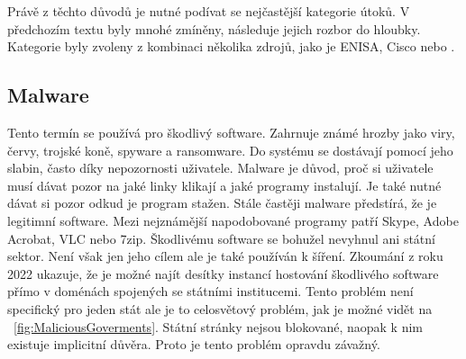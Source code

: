 Právě z těchto důvodů je nutné podívat se nejčastější kategorie útoků.
V předchozím textu byly mnohé zmíněny, následuje jejich rozbor do hloubky.
Kategorie byly zvoleny z kombinaci několika zdrojů, jako je \ac{ENISA}\cite{Enisa_thread_landscape}, Cisco\cite{cisco_most_common_attack} nebo \cite{nist_risks}.

\subsection{Malware}
Tento termín se používá pro škodlivý software.
Zahrnuje známé hrozby jako viry, červy, trojské koně, spyware a ransomware.
Do systému se dostávají pomocí jeho slabin, často díky nepozornosti uživatele.\cite{cisco_most_common_attack}
Malware je důvod, proč si uživatele musí dávat pozor na jaké linky klikají a jaké programy instalují.
Je také nutné dávat si pozor odkud je program stažen.
Stále častěji malware předstírá, že je legitimní software.
Mezi nejznámější napodobované programy patří Skype, Adobe Acrobat, VLC nebo 7zip.\cite{virustotal_report_findings}
Škodlivému software se bohužel nevyhnul ani státní sektor.
Není však jen jeho cílem ale je také používán k šíření.
Zkoumání z roku 2022 ukazuje, že je možné najít desítky instancí hostování škodlivého software přímo v doménách spojených se státními institucemi.\cite{virustotal_report_findings_goverment}
Tento problém není specifický pro jeden stát ale je to celosvětový problém, jak je možné vidět na ~\ref{fig:MaliciousGoverments}.
Státní stránky nejsou blokované, naopak k nim existuje implicitní důvěra.
Proto je tento problém opravdu závažný.
~

